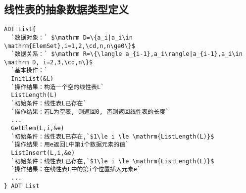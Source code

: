 \subsection{线性表的抽象数据类型定义}
\begin{frame}[fragile]
\begin{lstlisting}[mathescape=true]
ADT List{
  `数据对象：` $\mathrm D=\{a_i|a_i\in \mathrm{ElemSet},i=1,2,\cd,n,n\ge0\}$
  `数据关系：` $\mathrm R=\{\langle a_{i-1},a_i\rangle|a_{i-1},a_i\in \mathrm D, i=2,3,\cd,n\}$
  `基本操作：`
  InitList(&L)
  `操作结果：构造一个空的线性表L`
  ListLength(L)
  `初始条件：线性表L已存在`
  `操作结果：若L为空表, 则返回0, 否则返回线性表的长度`
  ...
  GetElem(L,i,&e)
  `初始条件：线性表L已存在,`$1\le i \le \mathrm{ListLength(L)}$
  `操作结果：用e返回L中第i个数据元素的值`
  ListInsert(L,i,&e)
  `初始条件：线性表L已存在,`$1\le i \le \mathrm{ListLength(L)}$
  `操作结果：在线性表L中的第i个位置插入元素e`
  ...
} ADT List
\end{lstlisting}
\end{frame}

